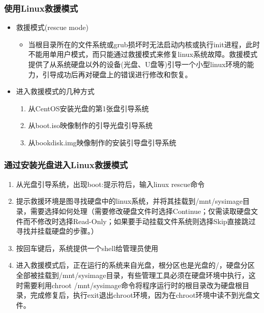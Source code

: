 \documentclass[xcolor=svgnames,presentation]{beamer}
\begin{document}
\begin{frame}
\frametitle{使用Linux救援模式}
\label{sec-1-12}
\begin{itemize}

\item 救援模式(rescue mode)
\label{sec-1-12-1}%
\begin{itemize}

\item 当根目录所在的文件系统或grub损坏时无法启动内核或执行init进程，此时不能用单用户模式，而只能通过救援模式来修复linux系统故障。救援模式提供了从系统硬盘以外的设备(光盘、U盘等)引导一个小型linux环境的能力，引导成功后再对硬盘上的错误进行修改和恢复。
\label{sec-1-12-1-1}%
\end{itemize} %

\item 进入救援模式的几种方式
\label{sec-1-12-2}%
\begin{enumerate}
\item 从CentOS安装光盘的第1张盘引导系统
\item 从boot.iso映像制作的引导光盘引导系统
\item 从bookdisk.img映像制作的安装引导盘引导系统
\end{enumerate}
\end{itemize} %
\end{frame}
\begin{frame}
\frametitle{通过安装光盘进入Linux救援模式}
\label{sec-1-13}

\begin{enumerate}
\item 从光盘引导系统，出现boot:提示符后，输入linux rescue命令
\item 提示救援环境是图寻找硬盘中的linux系统，并将其挂载到/mnt/sysimage目录，需要选择如何处理（需要修改硬盘文件时选择Continue；仅需读取硬盘文件而不修改时选择Read-Only；如果要手动挂载文件系统则选择Skip直接跳过寻找并挂载硬盘的步骤。）
\item 按回车键后，系统提供一个shell给管理员使用
\item 进入救援模式后，正在运行的系统来自光盘，根分区也是光盘的/，硬盘分区全部被挂载到/mnt/sysimage目录，有些管理工具必须在硬盘环境中执行，这时需要利用chroot /mnt/sysimage命令将程序运行时的根目录改为硬盘根目录，完成修复后，执行exit退出chroot环境，因为在chroot环境中读不到光盘文件。
\end{enumerate}
\end{frame}
\end{document}
